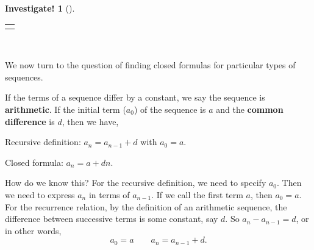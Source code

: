\documentclass[10pt,]{book}
\newcommand{\terminology}[1]{\textbf{#1}}
\theoremstyle{plain}
\theoremstyle{definition}
\theoremstyle{definition}
\theoremstyle{definition}
\newtheorem{investigation}[project]{Investigate!}
\theoremstyle{definition}
\numberwithin{equation}{chapter}
\newlength{\panelmax}
\newcommand{\vtx}[2]{node[fill,circle,inner sep=0pt, minimum size=4pt,label=#1:#2]{}}
\renewcommand{\v}{\vtx{above}{}}
\begin{document}
\begin{investigation}[]
\begin{enumerate}
{\begin{lrbox}{\panelboxAimage}
{{
}
}\end{lrbox}
\ifdefined\phAimage\else\newlength{\phAimage}\fi%
\setlength{\phAimage}{\ht\panelboxAimage+\dp\panelboxAimage}
\settototalheight{\phAimage}{\usebox{\panelboxAimage}}
\setlength{\panelmax}{\maxof{\panelmax}{\phAimage}}
\leavevmode%
\setlength{\tabcolsep}{0\linewidth}
\par\medskip\noindent
\hspace*{0.05\linewidth}%
\begin{tabular}{@{}*{1}{c}@{}}
\begin{minipage}[c][\panelmax][t]{0.9\linewidth}\usebox{\panelboxAimage}\end{minipage}\end{tabular}\\
}%
%
\end{enumerate}
%
\end{investigation}
\hypertarget{p-105}{}%
We now turn to the question of finding closed formulas for particular types of sequences.%
\begin{assemblage}\label{assemblage-3}
\hypertarget{p-106}{}%
If the terms of a sequence differ by a constant, we say the sequence is \terminology{arithmetic}. If the initial term (\(a_0\)) of the sequence is \(a\) and the \terminology{common difference} is \(d\), then we have,%
\par
\hypertarget{p-107}{}%
Recursive definition: \(a_n = a_{n-1} + d\) with \(a_0 = a\).%
\par
\hypertarget{p-108}{}%
Closed formula: \(a_n = a + dn\).%
\end{assemblage}
\hypertarget{p-109}{}%
How do we know this? For the recursive definition, we need to specify \(a_0\). Then we need to express \(a_n\) in terms of \(a_{n-1}\). If we call the first term \(a\), then \(a_0 = a\). For the recurrence relation, by the definition of an arithmetic sequence, the difference between successive terms is some constant, say \(d\). So \(a_n - a_{n-1} = d\), or in other words,%
\begin{equation*}
a_0 = a \qquad a_n=a_{n-1}+d.
\end{equation*}
\end{document}
